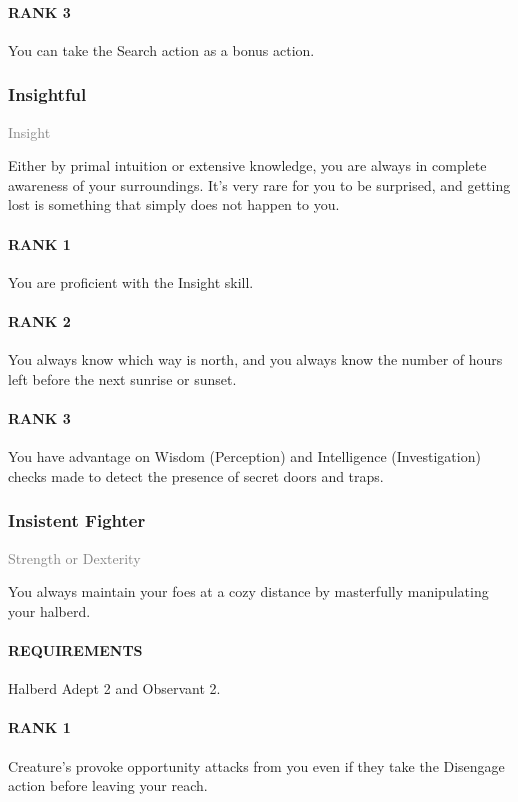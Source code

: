 \paragraph{RANK 3} You can take the Search action as a bonus action.

\subsubsection{Insightful} \label{tal::insightful}
\small{\textcolor{gray}{Insight}}

\normalsize
Either by primal intuition or extensive knowledge, you are always in complete awareness of your surroundings.
It's very rare for you to be surprised, and getting lost is something that simply does not happen to you.
\paragraph{RANK 1} You are proficient with the Insight skill.
\paragraph{RANK 2} You always know which way is north, and you always know the number of hours left before the next sunrise or sunset.
\paragraph{RANK 3} You have advantage on Wisdom (Perception) and Intelligence (Investigation) checks made to detect the presence of secret doors and traps.

\subsubsection{Insistent Fighter} \label{tal::insistentfighter}
\small{\textcolor{gray}{Strength or Dexterity}}

\normalsize
You always maintain your foes at a cozy distance by masterfully manipulating your halberd.
\paragraph{REQUIREMENTS} Halberd Adept 2 and Observant 2.
\paragraph{RANK 1} Creature's provoke opportunity attacks from you even if they take the Disengage action before leaving your reach.
